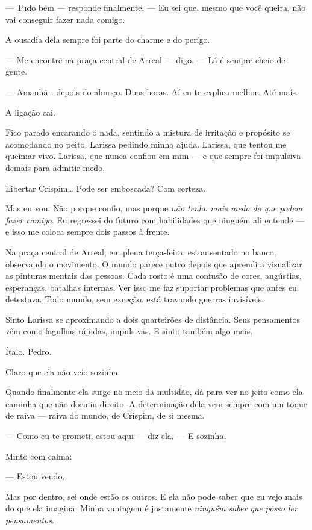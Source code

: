 — Tudo bem — responde finalmente. — Eu sei que, mesmo que você queira, não vai conseguir fazer nada comigo.

A ousadia dela sempre foi parte do charme e do perigo.

— Me encontre na praça central de Arreal — digo. — Lá é sempre cheio de gente.

— Amanhã… depois do almoço. Duas horas.  
Aí eu te explico melhor.  
Até mais.

A ligação cai.

Fico parado encarando o nada, sentindo a mistura de irritação e propósito se acomodando no peito.  
Larissa pedindo minha ajuda.  
Larissa, que tentou me queimar vivo.
Larissa, que nunca confiou em mim — e que sempre foi impulsiva demais para admitir medo.

Libertar Crispim…  
Pode ser emboscada?  
Com certeza.

Mas eu vou.  
Não porque confio, mas porque \emph{não tenho mais medo do que podem fazer comigo}.
Eu regressei do futuro com habilidades que ninguém ali entende — e isso me coloca sempre dois passos à frente.

\bigskip

Na praça central de Arreal, em plena terça-feira, estou sentado no banco, observando o movimento. O mundo parece outro depois que aprendi a visualizar as pinturas mentais das pessoas. Cada rosto é uma confusão de cores, angústias, esperanças, batalhas internas.
Ver isso me faz suportar problemas que antes eu detestava.  
Todo mundo, sem exceção, está travando guerras invisíveis.

Sinto Larissa se aproximando a dois quarteirões de distância.  
Seus pensamentos vêm como fagulhas rápidas, impulsivas.  
E sinto também algo mais.

Ítalo.  
Pedro.

Claro que ela não veio sozinha.

Quando finalmente ela surge no meio da multidão, dá para ver no jeito como ela caminha que não dormiu direito.  
A determinação dela vem sempre com um toque de raiva — raiva do mundo, de Crispim, de si mesma.

— Como eu te prometi, estou aqui — diz ela. — E sozinha.

Minto com calma:

— Estou vendo.

Mas por dentro, sei onde estão os outros.  
E ela não pode saber que eu vejo mais do que ela imagina.  
Minha vantagem é justamente \emph{ninguém saber que posso ler pensamentos}.


